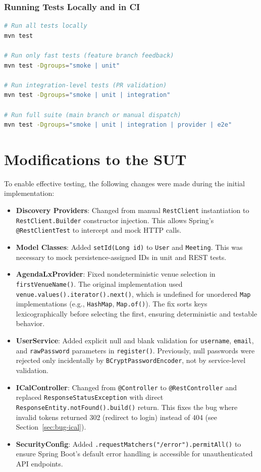 \documentclass[11pt]{article}
\begin{document}
  \subsubsection{Running Tests Locally and in CI}
  \begin{lstlisting}[language=bash]
# Run all tests locally
mvn test

# Run only fast tests (feature branch feedback)
mvn test -Dgroups="smoke | unit"

# Run integration-level tests (PR validation)
mvn test -Dgroups="smoke | unit | integration"

# Run full suite (main branch or manual dispatch)
mvn test -Dgroups="smoke | unit | integration | provider | e2e"
  \end{lstlisting}

  \section{Modifications to the SUT}
  \label{sec:modifications}
  To enable effective testing, the following changes were made during the initial implementation:
  \begin{itemize}
    \item \textbf{Discovery Providers}: Changed from manual \texttt{RestClient} instantiation to \texttt{RestClient.Builder} constructor injection. This allows Spring's \texttt{@RestClientTest} to intercept and mock HTTP calls.
    \item \textbf{Model Classes}: Added \texttt{setId(Long id)} to \texttt{User} and \texttt{Meeting}. This was necessary to mock persistence-assigned IDs in unit and REST tests.
    \item \textbf{AgendaLxProvider}: Fixed nondeterministic venue selection in \texttt{firstVenueName()}. The original implementation used \texttt{venue.values().iterator().next()}, which is undefined for unordered \texttt{Map} implementations (e.g., \texttt{HashMap}, \texttt{Map.of()}). The fix sorts keys lexicographically before selecting the first, ensuring deterministic and testable behavior.
    \item \textbf{UserService}: Added explicit null and blank validation for \texttt{username}, \texttt{email}, and \texttt{rawPassword} parameters in \texttt{register()}. Previously, null passwords were rejected only incidentally by \texttt{BCryptPasswordEncoder}, not by service-level validation.
    \item \textbf{ICalController}: Changed from \texttt{@Controller} to \texttt{@RestController} and replaced \texttt{ResponseStatusException} with direct \texttt{ResponseEntity.notFound().build()} return. This fixes the bug where invalid tokens returned 302 (redirect to login) instead of 404 (see Section~\ref{sec:bug-ical}).
    \item \textbf{SecurityConfig}: Added \texttt{.requestMatchers("/error").permitAll()} to ensure Spring Boot's default error handling is accessible for unauthenticated API endpoints.
  \end{itemize}
\end{document}
